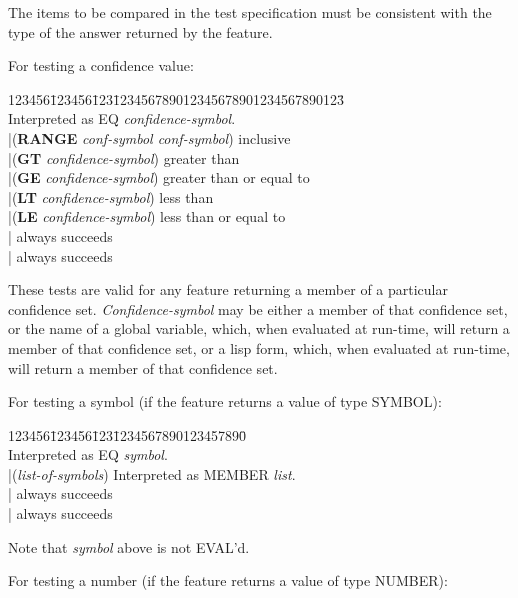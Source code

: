 The items to be compared in the test specification must be consistent
with the type of the answer returned by the feature.

For testing a confidence value:

\begin{tabbing}
123456\=123456\=123\=123456789012345678901234567890123\= \kill
{} \\
\>\> \>Interpreted as EQ
{\it confidence-symbol\/}. \\
\>\>|\>({\bf RANGE} {\it conf-symbol conf-symbol\/}) \>inclusive \\
\>\>|\>({\bf GT} {\it confidence-symbol\/}) \>greater than \\
\>\>|\>({\bf GE} {\it confidence-symbol\/}) \>greater than or equal to \\
\>\>|\>({\bf LT} {\it confidence-symbol\/}) \>less than \\
\>\>|\>({\bf LE} {\it confidence-symbol\/}) \>less than or equal to \\
\>\>| \>always succeeds\\
\>\>|\>{\bf *} \>always succeeds
\\
\end{tabbing}

These tests are valid for any feature returning a member of a
particular confidence set. {\it Confidence-symbol} may be either
a member of that confidence set, or the name of a global variable,
which, when evaluated at run-time, will return a member of that
confidence set, or a lisp form, which, when evaluated at run-time,
will return a member of that confidence set.

For testing a symbol (if the feature returns a value of type SYMBOL):

\begin{tabbing}
123456\=123456\=123\=1234567890123457890\= \kill
{} \\
\>\> \>Interpreted as EQ {\it symbol\/}. \\
\>\>|\>({\it list-of-symbols\/}) \>Interpreted as MEMBER {\it list\/}. \\
\>\>| \>always succeeds\\
\>\>|\>{\bf *} \>always succeeds
\\
\end{tabbing}

Note that {\it symbol\/} above is not EVAL'd.

For testing a number (if the feature returns a value of type NUMBER):

